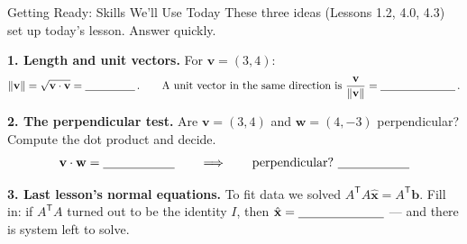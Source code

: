 \documentclass[10pt]{article}
\newcommand{\vv}{\mathbf{v}}
\newcommand{\ww}{\mathbf{w}}
\newcommand{\xx}{\mathbf{x}}
\newcommand{\bb}{\mathbf{b}}
\newcommand{\T}{\mathsf{T}}
\begin{document}
\namedateperiod

\vspace{0.12in}

\begin{notesbox}{Getting Ready: Skills We'll Use Today}
\small These three ideas (Lessons 1.2, 4.0, 4.3) set up today's lesson. Answer quickly.

\vspace{4pt}
\textbf{1. Length and unit vectors.} For $\vv=(3,4)$:
\[
  \|\vv\|=\sqrt{\vv\cdot\vv}=\blank{1.6cm}\,. \qquad
  \text{A unit vector in the same direction is } \frac{\vv}{\|\vv\|}=\blank{2.4cm}\,.
\]

\vspace{4pt}
\textbf{2. The perpendicular test.} Are $\vv=(3,4)$ and $\ww=(4,-3)$ perpendicular? Compute the dot
product and decide.
\[
  \vv\cdot\ww=\blank{2.0cm} \qquad\Longrightarrow\qquad \text{perpendicular?}\ \blank{2.0cm}
\]

\vspace{4pt}
\textbf{3. Last lesson's normal equations.} To fit data we solved $A^{\T}A\hat{\xx}=A^{\T}\bb$. Fill in: if
$A^{\T}A$ turned out to be the identity $I$, then $\hat{\xx}=\blank{2.4cm}$ --- and there is
\blank{2.4cm} system left to solve.
\end{notesbox}
\end{document}
